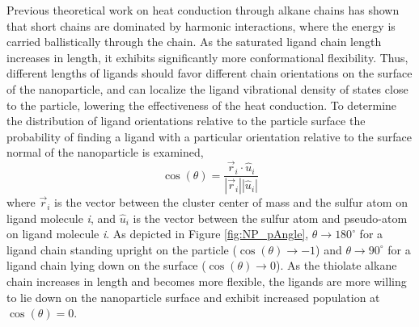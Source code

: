 Previous theoretical work on heat conduction through alkane chains has
shown that short chains are dominated by harmonic interactions, where
the energy is carried ballistically through the
chain.\cite{Segal:2003qy} As the saturated ligand chain length
increases in length, it exhibits significantly more conformational
flexibility. Thus, different lengths of ligands should favor different
chain orientations on the surface of the nanoparticle, and can
localize the ligand vibrational density of states close to the
particle, lowering the effectiveness of the heat
conduction.\cite{Segal:2003qy} To determine the distribution of ligand
orientations relative to the particle surface the 
probability of finding a ligand with a particular orientation relative
to the surface normal of the nanoparticle is examined,
\begin{equation} 
\cos{(\theta)}=\frac{\vec{r}_i\cdot\hat{u}_i}{|\vec{r}_i||\hat{u}_i|}
\end{equation}
where $\vec{r}_{i}$ is the vector between the cluster center of mass
and the sulfur atom on ligand molecule {\it i}, and $\hat{u}_{i}$ is
the  vector between the sulfur atom and  pseudo-atom on ligand
molecule {\it i}. As depicted in Figure \ref{fig:NP_pAngle}, $\theta
\rightarrow 180^{\circ}$ for a ligand chain standing upright on the
particle ($\cos{(\theta)} \rightarrow -1$) and $\theta \rightarrow
90^{\circ}$ for a ligand chain lying down on the surface
($\cos{(\theta)} \rightarrow 0$). As the thiolate alkane chain
increases in length and becomes more flexible, the ligands are more
willing to lie down on the nanoparticle surface and exhibit increased
population at $\cos{(\theta)} = 0$.

